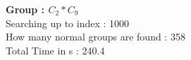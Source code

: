\textbf{Group : $C_2*C_9$}\\
Searching up to index : 1000\\
How many normal groups are found : 358\\
Total Time in s : 240.4\\
